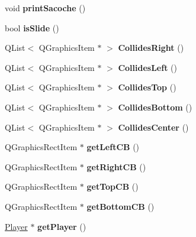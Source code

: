\begin{DoxyCompactItemize}
\item 
\hypertarget{class_pingouin_a736f73e55524b59c00479aef1f91f94d}{}void {\bfseries print\+Sacoche} ()\label{class_pingouin_a736f73e55524b59c00479aef1f91f94d}

\item 
\hypertarget{class_pingouin_a31dcd728180d2e85cf1c696ad2f0b062}{}bool {\bfseries is\+Slide} ()\label{class_pingouin_a31dcd728180d2e85cf1c696ad2f0b062}

\item 
\hypertarget{class_pingouin_ab65df246ceda4f50ec939faeb55a9550}{}Q\+List$<$ Q\+Graphics\+Item $\ast$ $>$ {\bfseries Collides\+Right} ()\label{class_pingouin_ab65df246ceda4f50ec939faeb55a9550}

\item 
\hypertarget{class_pingouin_a4775b4894d8b8165c778019de8df2d15}{}Q\+List$<$ Q\+Graphics\+Item $\ast$ $>$ {\bfseries Collides\+Left} ()\label{class_pingouin_a4775b4894d8b8165c778019de8df2d15}

\item 
\hypertarget{class_pingouin_aa81d4eaddce1ef53808d6d4978d1b132}{}Q\+List$<$ Q\+Graphics\+Item $\ast$ $>$ {\bfseries Collides\+Top} ()\label{class_pingouin_aa81d4eaddce1ef53808d6d4978d1b132}

\item 
\hypertarget{class_pingouin_af7dbd1097ef3d4cf4911d006fa67f06e}{}Q\+List$<$ Q\+Graphics\+Item $\ast$ $>$ {\bfseries Collides\+Bottom} ()\label{class_pingouin_af7dbd1097ef3d4cf4911d006fa67f06e}

\item 
\hypertarget{class_pingouin_a10126ab2598c56da1fe96bae1bedf9a7}{}Q\+List$<$ Q\+Graphics\+Item $\ast$ $>$ {\bfseries Collides\+Center} ()\label{class_pingouin_a10126ab2598c56da1fe96bae1bedf9a7}

\item 
\hypertarget{class_pingouin_aaa130c988fb99be84ae8ce057ff0466f}{}Q\+Graphics\+Rect\+Item $\ast$ {\bfseries get\+Left\+C\+B} ()\label{class_pingouin_aaa130c988fb99be84ae8ce057ff0466f}

\item 
\hypertarget{class_pingouin_a840603a098f62619f3cf6aef3ff71500}{}Q\+Graphics\+Rect\+Item $\ast$ {\bfseries get\+Right\+C\+B} ()\label{class_pingouin_a840603a098f62619f3cf6aef3ff71500}

\item 
\hypertarget{class_pingouin_a04bb88b6251aa853e1980c35005f7df8}{}Q\+Graphics\+Rect\+Item $\ast$ {\bfseries get\+Top\+C\+B} ()\label{class_pingouin_a04bb88b6251aa853e1980c35005f7df8}

\item 
\hypertarget{class_pingouin_aafa634e4ec962a442b5a4fdf1d029464}{}Q\+Graphics\+Rect\+Item $\ast$ {\bfseries get\+Bottom\+C\+B} ()\label{class_pingouin_aafa634e4ec962a442b5a4fdf1d029464}

\item 
\hypertarget{class_pingouin_ae8bf1799a91f7c7863731ddcfe1b1418}{}\hyperlink{class_player}{Player} $\ast$ {\bfseries get\+Player} ()\label{class_pingouin_ae8bf1799a91f7c7863731ddcfe1b1418}

\end{DoxyCompactItemize}
